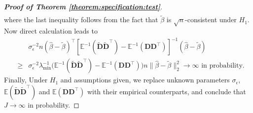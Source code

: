 \documentclass[11pt, preprint]{imsart}
\numberwithin{equation}{section}
\def \bfD{\mathbf{D}}
\def \bfD{\mathbf{D}}
\def \ev{\mathbb{E}}
\theoremstyle{plain}
\theoremstyle{definition}
\begin{document}
\begin{proof}[\textbf{Proof of Theorem \ref{theorem:specification:test}}]
\begin{eqnarray*}
\end{eqnarray*}
where the last inequality follows from the fact that $\widetilde{\beta}$ is $\sqrt{n}$-consistent under $H_1$. Now direct calculation leads to
\begin{eqnarray*}
	&&\sigma_\epsilon^{-2} n(\widehat{\beta}-\widetilde{\beta})^\top[\ev^{-1}(\widetilde{\bfD}\widetilde{\bfD}^\top)-\ev^{-1}({\bfD}{\bfD}^\top)]^{-1}(\widehat{\beta}-\widetilde{\beta})\nonumber\\
	&\geq& \sigma_\epsilon^{-2} \lambda_{\min}^{-1}\bigg(\ev^{-1}(\widetilde{\bfD}\widetilde{\bfD}^\top)-\ev^{-1}({\bfD}{\bfD}^\top)\bigg)n\|\widehat{\beta}-\widetilde{\beta}\|_2^2 \to\infty \textrm{ in probability}.
\end{eqnarray*}
Finally, Under $H_1$ and assumptions given, we replace unknown parameters $\sigma_\epsilon$, $\ev(\widetilde{\bfD}\widetilde{\bfD}^\top)$ and $\ev({\bfD}{\bfD}^\top)$ with their empirical counterparts, and conclude that $J \to \infty$ in probability.
\end{proof}
\end{document}

